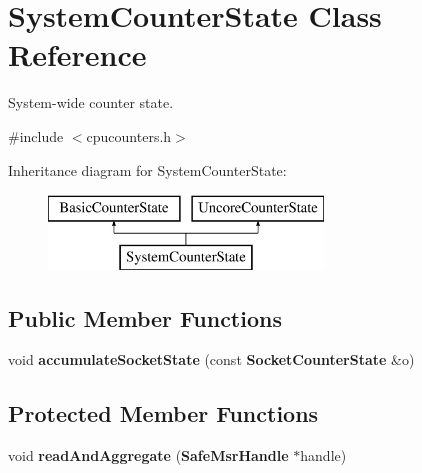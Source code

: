 \section{System\+Counter\+State Class Reference}
\label{classSystemCounterState}


System-\/wide counter state.  




{\ttfamily \#include $<$cpucounters.\+h$>$}

Inheritance diagram for System\+Counter\+State\+:\begin{figure}[H]
\begin{center}
\leavevmode
\includegraphics[height=2.000000cm]{classSystemCounterState}
\end{center}
\end{figure}
\subsection*{Public Member Functions}
\begin{DoxyCompactItemize}
\item 
void {\bfseries accumulate\+Socket\+State} (const {\bf Socket\+Counter\+State} \&o)\label{classSystemCounterState_af8fb0cdf2c4d03ec03b1ef2e4c27aac4}

\end{DoxyCompactItemize}
\subsection*{Protected Member Functions}
\begin{DoxyCompactItemize}
\item 
void {\bfseries read\+And\+Aggregate} ({\bf Safe\+Msr\+Handle} $\ast$handle)\label{classSystemCounterState_a8fe045dbb23a309ecd8ec75cf5563c60}

\end{DoxyCompactItemize}
